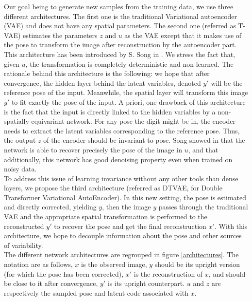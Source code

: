 \documentclass[letterpaper, twoside]{article}
\begin{document}
Our goal being to generate new samples from the training data, we use three different architectures. The first one is the traditional Variational autoencoder (VAE) and does not have any spatial parameters. The second one (referred as T-VAE) estimates the parameters $z$ and $u$ as the VAE except that it makes use of the pose to transform the image after reconstruction by the autoencoder part. This architecture has been introduced by S. Song in \cite{Siyu:vae}. We stress the fact that, given $u$, the transformation is completely deterministic and non-learned. The rationale behind this architecture is the following: we hope that after convergence, the hidden layer behind the latent variables, denoted $y'$ will be the reference pose of the input. Meanwhile, the spatial layer will transform this image $y'$ to fit exactly the pose of the input. A priori, one drawback of this architecture is the fact that the input is directly linked to the hidden variables by a non-spatially equivariant network. For any pose the digit might be in, the encoder needs to extract the latent variables corresponding to the reference pose. Thus, the output $z$ of the encoder should be invariant to pose. Song showed in \cite{Siyu:vae} that the network is able to recover precisely the pose of the image in $u$, and that additionally, this network has good denoising property even when trained on noisy data.\\
To address this issue of learning invariance without any other tools than dense layers, we propose the third architecture (referred as DTVAE, for Double Transformer Variational AutoEncoder). In this new setting, the pose is estimated and directly corrected, yielding $y$, then the image $y$ passes through the traditional VAE and the appropriate spatial transformation is performed to the reconstructed $y'$ to recover the pose and get the final reconstruction $x'$. With this architecture, we hope to decouple information about the pose and other sources of variability.\\

The different network architectures are regrouped in figure \ref{architectures}. The notation are as follows, $x$ is the observed image, $y$ should be its upright version (for which the pose has been corrected), $x'$ is the reconstruction of $x$, and should be close to it after convergence, $y'$ is its upright counterpart. $u$ and $z$ are respectively the sampled pose and latent code associated with $x$.
\end{document}
